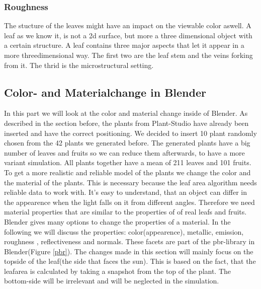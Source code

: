 \subsubsection{Roughness}
The stucture of the leaves might have an impact on the viewable color aswell. A leaf as we know it, is not a 2d surface, but more a three dimensional object with a certain structure. A leaf contains three major aspects that let it appear in a more threedimensional way. The first two are the leaf stem and the veins forking from it. The thrid is the microstructural setting.

\subsection{Color- and Materialchange in Blender}


In this part we will look at the color and material change inside of Blender. As described in the section before, the plants from Plant-Studio have already been inserted and have the correct positioning. We decided to insert 10 plant randomly chosen from the 42 plants we generated before. The generated plants have a big number of leaves and fruits so we can reduce them afterwards, to have a more variant simulation. \newline
All plants together have a mean of 211 leaves and 101 fruits.
To get a more realistic and reliable model of the plants we change the color and the material of the plants. This is necessary because the leaf area algorithm needs reliable data to work with. It's easy to understand, that an object can differ in the appearence when the light falls on it from different angles. Therefore we need material properties that are similar to the properties of of real leafs and fruits.
Blender gives many options to change the properties of a material. In the following we will discuss the properties: color(appearence), metallic, emission, roughness , reflectiveness and normals. These facets are part of the pbr-library in Blender(Figure \ref{pbr}).
The changes made in this section will mainly focus on the topside of the leaf(the side that faces the sun). This is based on the fact, that the leafarea is calculated by taking a snapshot from the top of the plant. The bottom-side will be irrelevant and will be neglected in the simulation.

